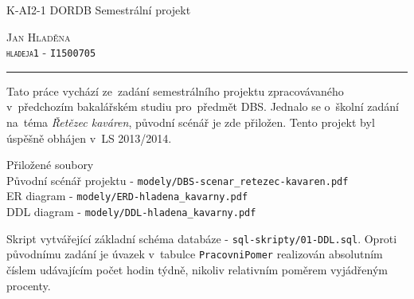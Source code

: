 \documentclass[a4paper,10pt]{article}
\author{Bc. Jan Hladěna}
\begin{document}
\pagestyle{empty} %



\begin{minipage}[t]{0.6\textwidth}
\par{ {{K-AI2-1 DORDB Semestrální projekt}}}
\end{minipage}
\begin{minipage}[t]{0.4\textwidth}
  \begin{flushright}
  	\par{ {\textsc{Jan Hladěna \\ \texttt{hladeja1} - \texttt{I1500705} }}}
  \end{flushright}
\end{minipage}

\begin{center}
	\noindent\rule{\textwidth}{0.3pt}
\end{center}


\par Tato práce vychází ze~zadání semestrálního projektu zpracovávaného v~předchozím
bakalářském studiu pro~předmět DBS. Jednalo se o~školní zadání na~téma \emph{Řetězec
kaváren}, původní scénář je zde přiložen. Tento projekt byl úspěšně obhájen v~LS
2013/2014. \\

\bigskip

\par Přiložené soubory \\
Původní scénář projektu - \texttt{modely/DBS-scenar\_retezec-kavaren.pdf} \\
ER diagram - \texttt{modely/ERD-hladena\_kavarny.pdf} \\
DDL diagram - \texttt{modely/DDL-hladena\_kavarny.pdf} \\

\par Skript vytvářející základní schéma databáze - \texttt{sql-skripty/01-DDL.sql}.
Oproti původnímu zadání je úvazek v~tabulce \texttt{PracovniPomer} realizován absolutním
číslem udávajícím počet hodin týdně, nikoliv relativním poměrem vyjádřeným procenty.
\end{document}
